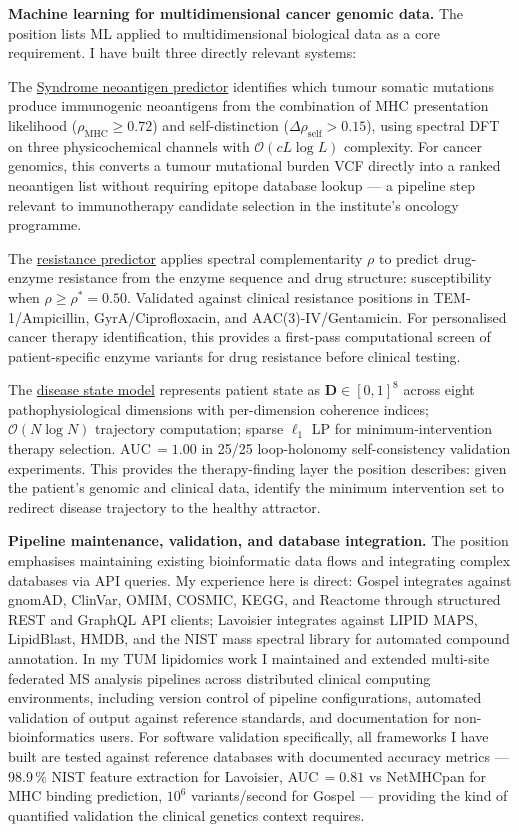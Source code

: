 \documentclass[12pt,a4paper]{article}
\begin{document}
\textbf{Machine learning for multidimensional cancer genomic data.}
The position lists ML applied to multidimensional biological data as a
core requirement. I have built three directly relevant systems:

The \href{https://syndrome-seven.vercel.app/tools/neoantigen}{Syndrome neoantigen predictor}
identifies which tumour somatic mutations produce immunogenic neoantigens from
the combination of MHC presentation likelihood ($\rho_\mathrm{MHC} \geq 0.72$)
and self-distinction ($\Delta\rho_\mathrm{self} > 0.15$), using spectral DFT
on three physicochemical channels with $\mathcal{O}(cL\log L)$ complexity.
For cancer genomics, this converts a tumour mutational burden VCF directly
into a ranked neoantigen list without requiring epitope database lookup ---
a pipeline step relevant to immunotherapy candidate selection in the
institute's oncology programme.

The \href{https://syndrome-seven.vercel.app/tools/resistance}{resistance predictor}
applies spectral complementarity $\rho$ to predict drug-enzyme resistance from
the enzyme sequence and drug structure: susceptibility when $\rho \geq \rho^* = 0.50$.
Validated against clinical resistance positions in TEM-1/Ampicillin,
GyrA/Ciprofloxacin, and AAC(3)-IV/Gentamicin.
For personalised cancer therapy identification, this provides a first-pass
computational screen of patient-specific enzyme variants for drug resistance
before clinical testing.

The \href{https://github.com/fullscreen-triangle/syndrome}{disease state model}
represents patient state as $\mathbf{D}\in[0,1]^8$ across eight pathophysiological
dimensions with per-dimension coherence indices; $\mathcal{O}(N\log N)$ trajectory
computation; sparse $\ell_1$ LP for minimum-intervention therapy selection.
AUC$\,=1.00$ in 25/25 loop-holonomy self-consistency validation experiments.
This provides the therapy-finding layer the position describes: given the patient's
genomic and clinical data, identify the minimum intervention set to redirect
disease trajectory to the healthy attractor.

\textbf{Pipeline maintenance, validation, and database integration.}
The position emphasises maintaining existing bioinformatic data flows and
integrating complex databases via API queries. My experience here is direct:
Gospel integrates against gnomAD, ClinVar, OMIM, COSMIC, KEGG, and Reactome
through structured REST and GraphQL API clients; Lavoisier integrates against
LIPID MAPS, LipidBlast, HMDB, and the NIST mass spectral library for automated
compound annotation. In my TUM lipidomics work I maintained and extended
multi-site federated MS analysis pipelines across distributed clinical
computing environments, including version control of pipeline configurations,
automated validation of output against reference standards, and documentation
for non-bioinformatics users.
For software validation specifically, all frameworks I have built are tested
against reference databases with documented accuracy metrics --- 98.9\,\% NIST
feature extraction for Lavoisier, AUC$\,=0.81$ vs NetMHCpan for MHC binding
prediction, $10^6$ variants/second for Gospel --- providing the kind of
quantified validation the clinical genetics context requires.
\end{document}
